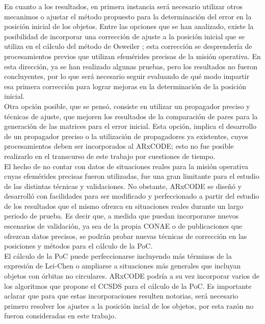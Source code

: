 En cuanto a los resultados, en primera instancia ser\'a necesario utilizar otros mecanimos o ajustar el m\'etodo propuesto para la determinaci\'on del error en la posici\'on inicial de los objetos. Entre las opciones que se han analizado, existe la posibilidad de incorporar una correcci\'on de ajuste a la posici\'on inicial que se utiliza en el c\'alculo del m\'etodo de Osweiler \citep{osweiler}; esta correcci\'on se desprender\'ia de procesamientos previos que utilizan efem\'erides precisas de la misi\'on operativa. En esta direcci\'on, ya se han realizado algunas pruebas, pero los resultados no fueron concluyentes, por lo que ser\'a necesario seguir evaluando de qu\'e modo impartir esa primera correcci\'on para lograr mejoras en la determinaci\'on de la posici\'on inicial.\\

Otra opci\'on posible, que se pens\'o, consiste en utilizar un propagador preciso y t\'ecnicas de ajuste, que mejoren los resultados de la comparaci\'on de pares para la generaci\'on de las matrices para el error inicial. Esta opci\'on, implica el desarrollo de un propagador preciso o la utilizaci\'on de propagadores ya existentes, cuyos procesamientos deben ser incorporados al ARxCODE; esto no fue posible realizarlo en el transcurso de este trabajo por cuestiones de tiempo.\\

El hecho de no contar con datos de situaciones reales para la misi\'on operativa cuyas efem\'erides precisas fueron utilizadas, fue una gran limitante para  el estudio de las distintas t\'ecnicas y validaciones. No obstante, ARxCODE se dise\~n\'o y desarroll\'o con facilidades para ser modificado y perfeccionado a partir del estudio de los resultados que el mismo ofrezca en situaciones reales durante un largo periodo de prueba. Es decir que, a medida que puedan incorporarse nuevos escenarios de validaci\'on, ya sea de la propia CONAE o de publicaciones que ofrezcan datos precisos, se podr\'an probar nuevas t\'ecnicas de correcci\'on en las posiciones y m\'etodos para el c\'alculo de la PoC.\\

El c\'alculo de la PoC puede perfeccionarse incluyendo m\'as t\'erminos de la expresi\'on de Lei-Chen \citep{leichen} o ampliarse a situaciones m\'as generales que incluyan objetos con \'orbitas no circulares. ARxCODE podr\'ia a su vez incorporar varios de los algoritmos que propone el CCSDS para el c\'alculo de la PoC. Es importante aclarar que para que estas incorporaciones resulten notorias, ser\'a necesario primero resolver los ajustes a la posici\'on incial de los objetos, por esta raz\'on no fueron consideradas en este trabajo.\\


\endinput